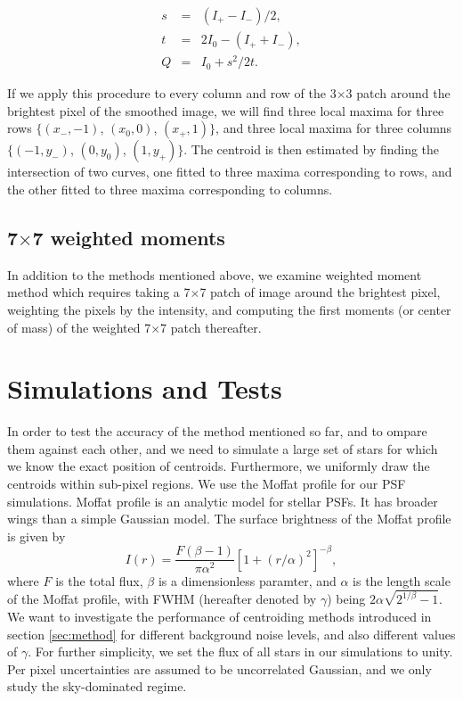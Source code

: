 \documentclass[12pt, preprint]{aastex}
\newcommand{\beq}{\begin{equation}}
\newcommand{\eeq}{\end{equation}}
\begin{document}
\begin{eqnarray}
s&=&(I_{+}-I_{-})/2, \\
t &=&2I_{0} - (I_{+}+I_{-}), \\
Q &=& I_{0} +s^{2}/2t.
\label{def}
\end{eqnarray}

If we apply this procedure to every column and row of the 3$\times$3 patch
around the brightest pixel of the smoothed image, we will find three local
maxima for three rows $\{(x_{-},-1)$, $(x_{0},0)$, $(x_{+},1)\}$, and three
local maxima for three columns $\{(-1,y_{-})$, $(0,y_{0})$, $(1,y_{+})\}$.
The centroid is then estimated by finding the intersection of two curves,
one fitted to three maxima corresponding to rows, and the other fitted
to three maxima corresponding to columns.

\subsection{7$\times$7 weighted moments}

In addition to the methods mentioned above, we examine weighted moment method which
requires taking a 7$\times$7 patch of image around the brightest pixel,
weighting the pixels by the intensity, and computing the first moments (or center
of mass) of the weighted 7$\times$7 patch thereafter. 

\section{Simulations and Tests}\label{sec:data}

In order to test the accuracy of the method mentioned so far, and to ompare them against each other,
and we need to simulate a large set of stars for which we know the exact position of centroids.
Furthermore, we uniformly draw the centroids within sub-pixel regions. 
We use the Moffat profile \citep{moffat} for our PSF simulations. 
Moffat profile is an analytic model for stellar PSFs. It has broader wings than
a simple Gaussian model. The surface brightness of the Moffat profile is given by
\beq
I(r) = \frac{F(\beta -1)}{\pi \alpha^{2}}[1+(r/\alpha)^{2}]^{-\beta},
\label{mof}
\eeq
where $F$ is the total flux, $\beta$ is a dimensionless paramter, and $\alpha$ is
the length scale of the Moffat profile, with FWHM (hereafter denoted by $\gamma$)
being $2\alpha\sqrt{2^{1/\beta}-1}$. 
We want to investigate the performance of centroiding methods introduced
in section \ref{sec:method} for different background noise levels, and also different
values of $\gamma$. For further simplicity, we set the flux of all stars in our
simulations to unity. Per pixel uncertainties are assumed to be uncorrelated Gaussian,
and we only study the sky-dominated regime.
\end{document}
